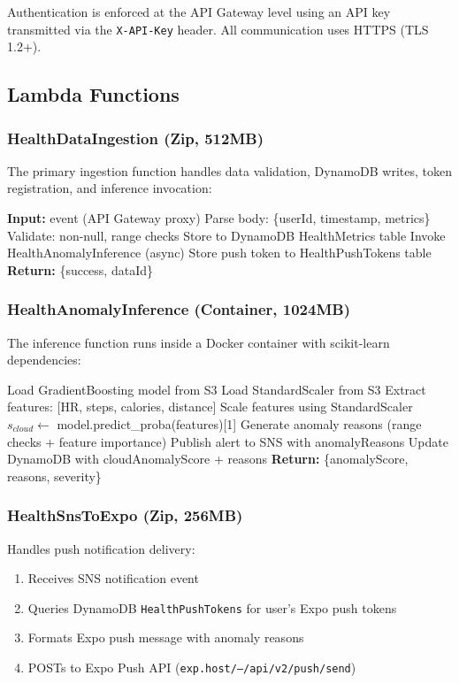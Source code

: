 \documentclass[conference]{IEEEtran}
\begin{document}
Authentication is enforced at the API Gateway level using an API key transmitted via the \texttt{X-API-Key} header. All communication uses HTTPS (TLS 1.2+).

\subsection{Lambda Functions}

\subsubsection{HealthDataIngestion (Zip, 512MB)}
The primary ingestion function handles data validation, DynamoDB writes, token registration, and inference invocation:

\begin{algorithmic}
\STATE \textbf{Input:} event (API Gateway proxy)
\STATE Parse body: \{userId, timestamp, metrics\}
\STATE Validate: non-null, range checks
\STATE Store to DynamoDB HealthMetrics table
    \STATE Invoke HealthAnomalyInference (async)
\ENDIF
{}
    \STATE Store push token to HealthPushTokens table
\ENDIF
\STATE \textbf{Return:} \{success, dataId\}
\end{algorithmic}

\subsubsection{HealthAnomalyInference (Container, 1024MB)}
The inference function runs inside a Docker container with scikit-learn dependencies:

\begin{algorithmic}
\STATE Load GradientBoosting model from S3
\STATE Load StandardScaler from S3
\STATE Extract features: [HR, steps, calories, distance]
\STATE Scale features using StandardScaler
\STATE $s_{cloud} \leftarrow$ model.predict\_proba(features)[1]
\STATE Generate anomaly reasons (range checks + feature importance)
    \STATE Publish alert to SNS with anomalyReasons
    \STATE Update DynamoDB with cloudAnomalyScore + reasons
\ENDIF
\STATE \textbf{Return:} \{anomalyScore, reasons, severity\}
\end{algorithmic}

\subsubsection{HealthSnsToExpo (Zip, 256MB)}
Handles push notification delivery:
\begin{enumerate}
    \item Receives SNS notification event
    \item Queries DynamoDB \texttt{HealthPushTokens} for user's Expo push tokens
    \item Formats Expo push message with anomaly reasons
    \item POSTs to Expo Push API (\texttt{exp.host/--/api/v2/push/send})
\end{enumerate}
\end{document}
